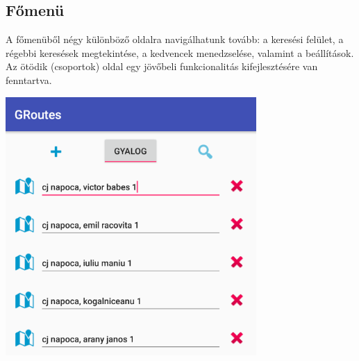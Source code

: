 \subsection{Főmenü}

A főmenüből négy különböző oldalra navigálhatunk tovább: a keresési felület, a régebbi keresések megtekintése, a kedvencek menedzselése, valamint a beállítások. Az ötödik (csoportok) oldal egy jövőbeli funkcionalitás kifejlesztésére van fenntartva.

\noindent
\begin{minipage}{\linewidth}
	\centering
	\begin{multicols}{2}
		
		\setlength{\abovecaptionskip}{10pt}
		\begin{Figure}
			\includegraphics[width=\linewidth]{images/search}
		\end{Figure}
	

\end{multicols}
\end{minipage}
